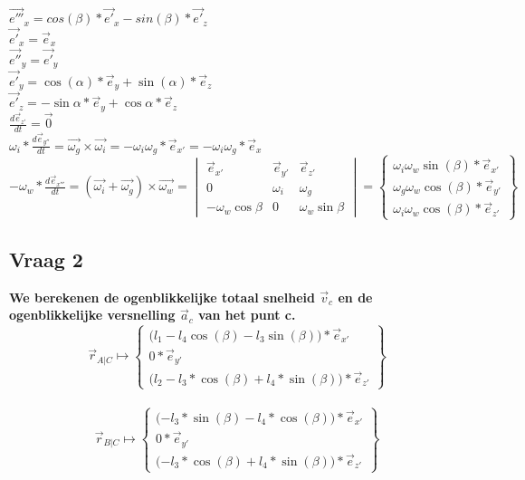 \documentclass[a4paper,10pt]{article}
\begin{document}
\begin{center}
	$\vec{e'''}_{x} = cos(\beta) *\vec{e'}_{x} - sin(\beta) *\vec{e'}_{z}$\\
	$\vec{e'}_{x}=\vec{e}_{x}$\\
	$\vec{e''}_{y} = \vec{e'}_{y} $\\
	$\vec{e'}_{y} = \cos(\alpha)*\vec{e}_{y} + \sin(\alpha)*\vec{e}_z $\\
	$\vec{e'}_{z} = -\sin{\alpha}*\vec{e}_{y} + \cos{\alpha}*\vec{e}_z $\\
	$\frac{d\vec{e}_{z'}}{dt}=\vec{0}$\\
	$\omega_i * \frac{d\vec{e}_{y''}}{dt}=\vec{\omega_g}\times\vec{\omega_i} = -\omega_i \omega_g *\vec{e}_{x'} = -\omega_i \omega_g *\vec{e}_{x}  $\\
	$-\omega_w * \frac{d\vec{e}_{x'''}}{dt} = (\vec{\omega_i} + \vec{\omega_g})\times\vec{\omega_w} = \begin{vmatrix}
	\vec{e}_{x'}&\vec{e}_{y'}&\vec{e}_{z'}\\
	0 & \omega_i & \omega_g\\
	-\omega_w \cos{\beta} & 0 & \omega_w \sin{\beta}
	\end{vmatrix} = \begin{Bmatrix}
	\omega_i \omega_w \sin(\beta)  *\vec{e}_{x'} \\
	\omega_g \omega_w \cos(\beta) *\vec{e}_{y'}\\
	\omega_i \omega_w \cos(\beta) *\vec{e}_{z'}
	\end{Bmatrix}
	$
\end{center}
\subsection{Vraag 2}
\textbf{We berekenen de ogenblikkelijke totaal snelheid $\vec{v}_c$ en de ogenblikkelijke versnelling $\vec{a}_c$ van het punt c.}\\
\begin{equation}
	\vec{r}_{A|C} \mapsto \begin{Bmatrix}
		\Big({l_1 - l_4 \cos(\beta)-l_3 \sin(\beta)\Big)*\vec{e}_{x'}}\\
		0 * \vec{e}_{y'}\\
		\Big ({l_2 - l_3*\cos(\beta) + l_4 *\sin(\beta)\Big) * \vec{e}_{z'}}
	\end{Bmatrix}
\end{equation}\\
\begin{equation}
	\vec{r}_{B|C} \mapsto \begin{Bmatrix}
		\Big({ - l_3 * \sin(\beta) - l_4 * \cos(\beta)\Big)*\vec{e}_{x'}}\\
		0 * \vec{e}_{y'}\\
		\Big ({ - l_3*\cos(\beta) + l_4 *\sin(\beta)\Big) * \vec{e}_{z'}}
	\end{Bmatrix}
\end{equation}\\
\end{document}
